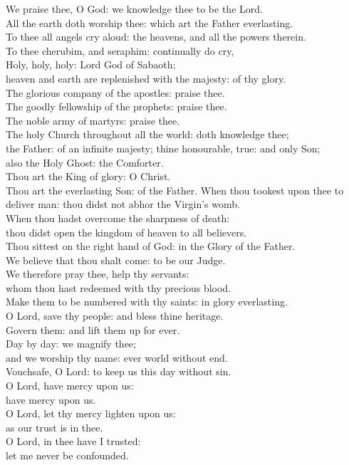{\vspace{2em}


\begin{center}
	
We praise thee, O God: we knowledge thee to be the Lord.\\
All the earth doth worship thee: which art the Father everlasting.\\
To thee all angels cry aloud: the heavens, and all the powers therein.\\
To thee cherubim, and seraphim: continually do cry,\\
Holy, holy, holy: Lord God of Sabaoth;\\
heaven and earth are replenished with the majesty: of thy glory.\\
The glorious company of the apostles: praise thee.\\
The goodly fellowship of the prophets: praise thee.\\
The noble army of martyrs: praise thee.\\
The holy Church throughout all the world: doth knowledge thee;\\
the Father: of an infinite majesty; thine honourable, true: and only Son;\\
also the Holy Ghost: the Comforter.\\
Thou art the King of glory: O Christ.\\
Thou art the everlasting Son: of the Father.
When thou tookest upon thee to deliver man:
thou didst not abhor the Virgin’s womb.\\
When thou hadst overcome the sharpness of death:\\
thou didst open the kingdom of heaven to all believers.\\
Thou sittest on the right hand of God: in the Glory of the Father.\\
We believe that thou shalt come: to be our Judge.\\
We therefore pray thee, help thy servants:\\
whom thou hast redeemed with thy precious blood.\\
Make them to be numbered with thy saints: in glory everlasting.\\
O Lord, save thy people: and bless thine heritage.\\
Govern them: and lift them up for ever.\\Day by day: we magnify thee;\\
and we worship thy name: ever world without end.\\
Vouchsafe, O Lord: to keep us this day without sin.\\
O Lord, have mercy upon us:\\have mercy upon us.\\
O Lord, let thy mercy lighten upon us:\\as our trust is in thee.\\
O Lord, in thee have I trusted:\\ let me never be confounded.


\end{center}}
